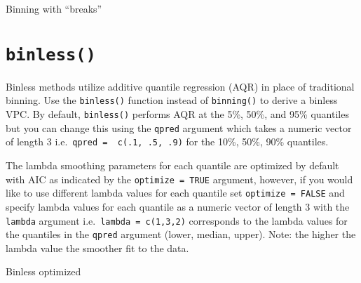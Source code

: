 \documentclass[
]{book}
\newenvironment{Shaded}{\begin{snugshade}}{\end{snugshade}}
\newcommand{\DataTypeTok}[1]{\textcolor[rgb]{0.13,0.29,0.53}{#1}}
\newcommand{\DecValTok}[1]{\textcolor[rgb]{0.00,0.00,0.81}{#1}}
\newcommand{\KeywordTok}[1]{\textcolor[rgb]{0.13,0.29,0.53}{\textbf{#1}}}
\newcommand{\NormalTok}[1]{#1}
\newcommand{\OperatorTok}[1]{\textcolor[rgb]{0.81,0.36,0.00}{\textbf{#1}}}
\newcommand{\StringTok}[1]{\textcolor[rgb]{0.31,0.60,0.02}{#1}}
\begin{document}
Binning with ``breaks''

\begin{Shaded}
\end{Shaded}

\hypertarget{binless}{%
\section{\texorpdfstring{\texttt{binless()}}{binless()}}\label{binless}}

Binless methods utilize additive quantile regression (AQR) in place of traditional binning. Use the \texttt{binless()} function instead of \texttt{binning()} to derive a binless VPC. By default, \texttt{binless()} performs AQR at the 5\%, 50\%, and 95\% quantiles but you can change this using the \texttt{qpred} argument which takes a numeric vector of length 3 i.e.~\texttt{qpred\ =\ \ c(.1,\ .5,\ .9)} for the 10\%, 50\%, 90\% quantiles.

The lambda smoothing parameters for each quantile are optimized by default with AIC as indicated by the \texttt{optimize\ =\ TRUE} argument, however, if you would like to use different lambda values for each quantile set \texttt{optimize\ =\ FALSE} and specify lambda values for each quantile as a numeric vector of length 3 with the \texttt{lambda} argument i.e.~\texttt{lambda\ =\ c(1,3,2)} corresponds to the lambda values for the quantiles in the \texttt{qpred} argument (lower, median, upper). Note: the higher the lambda value the smoother fit to the data.

Binless optimized

\begin{Shaded}
\end{Shaded}
\end{document}
